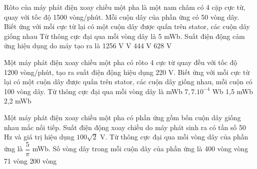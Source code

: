 \begin{vidu} %
	Rôto của máy phát điện xoay chiều một pha là một nam châm có 4 cặp cực từ, quay với tốc độ 1500 vòng/phút. Mỗi cuộn dây của phần ứng có 50 vòng dây. Biết ứng với mỗi cực từ lại có một cuộn dây được quấn trên stator, các cuộn dây giống nhau Từ thông cực đại qua mỗi vòng dây là 5 mWb. Suất điện động cảm ứng hiệu dụng do máy tạo ra là
	\choice
	{1256 V}
	{ V}
	{444 V}
	{628 V}
\end{vidu}
\begin{vidu} %
	Một máy phát điện xoay chiều một pha có rôto 4 cực từ quay đều với tốc độ 1200 vòng/phút, tạo ra suất điện động hiệu dụng 220 V. Biết ứng với mỗi cực từ lại có một cuộn dây được quấn trên stator, các cuộn dây giống nhau, mỗi cuộn có 100 vòng dây. Từ thông cực đại qua mỗi vòng dây là
	\choice
	{ mWb}
	{$7,7. 10^{-4}$ Wb}
	{1,5 mWb}
	{2,2 mWb}
\end{vidu}
\begin{vidu} %
	 Một máy phát điện xoay chiều một pha có phần ứng gồm bốn cuộn dây giống nhau mắc nối tiếp. Suất điện động xoay chiều do máy phát sinh ra có tần số 50 Hz và giá trị hiệu dụng $100\sqrt{2}$ V. Từ thông cực đại qua mỗi vòng dây của phần ứng là $\dfrac{5}{\pi }$ mWb. Số vòng dây trong mỗi cuộn dây của phần ứng là
	\choice
	{400 vòng}
	{ vòng}
	{71 vòng}
	{200 vòng}
\end{vidu}
